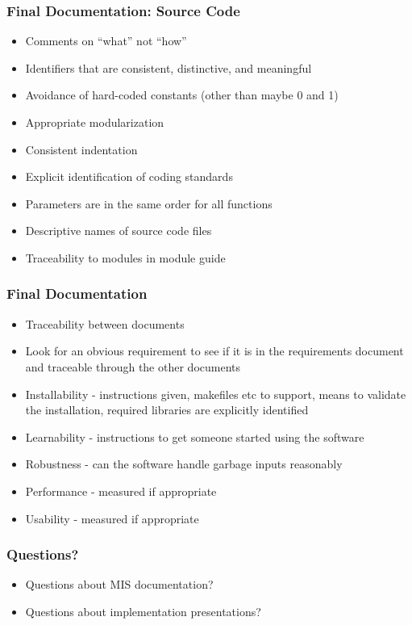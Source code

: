 \documentclass[t,12pt,numbers,fleqn]{beamer}
\begin{document}

\begin{frame}
\frametitle{Final Documentation: Source Code}
\begin{itemize}
\item Comments on ``what'' not ``how''
\item Identifiers that are consistent, distinctive, and meaningful
\item Avoidance of hard-coded constants (other than maybe 0 and 1)
\item Appropriate modularization
\item Consistent indentation
\item Explicit identification of coding standards
\item Parameters are in the same order for all functions
\item Descriptive names of source code files
\item Traceability to modules in module guide
\end{itemize}
\end{frame}


\begin{frame}
\frametitle{Final Documentation}
\begin{itemize}
\item Traceability between documents
\item Look for an obvious requirement to see if it is in the requirements
  document and traceable through the other documents
\item Installability - instructions given, makefiles etc to support, means to
  validate the installation, required libraries are explicitly identified
\item Learnability - instructions to get someone started using the software
\item Robustness - can the software handle garbage inputs reasonably
\item Performance - measured if appropriate
\item Usability - measured if appropriate
\end{itemize}
\end{frame}


\begin{frame}
\frametitle{Questions?}
\begin{itemize}
\item Questions about MIS documentation?
\item Questions about implementation presentations?
\end{itemize}
\end{frame}
\end{document}
